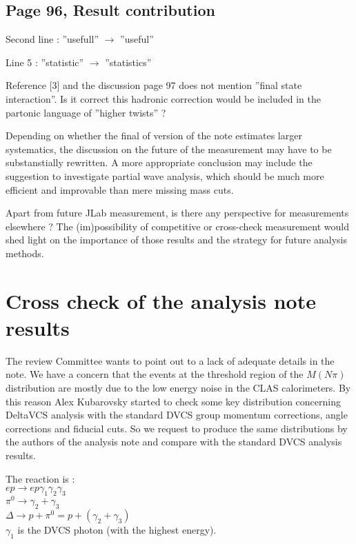 \documentclass[11pt]{paper}
\begin{document}
\subsection*{Page 96, Result contribution}
 
Second line : ''usefull'' $\rightarrow$ ''useful''
 
Line 5 : ''statistic'' $\rightarrow$ ''statistics''
  
Reference [3] and the discussion page 97 does not mention ''final state interaction''.
Is it correct this hadronic correction would be included in the partonic language of ''higher twists'' ?

Depending on whether the final of version of the note estimates larger systematics, the discussion on the future of the measurement may have to be substanstially rewritten.
A more appropriate conclusion may include the suggestion to investigate partial wave analysis, which should be much more efficient and improvable than mere missing mass cuts.

Apart from future JLab measurement, is there any perspective for measurements elsewhere ?
The (im)possibility of competitive or cross-check measurement would shed light on the importance of those results and the strategy for future analysis methods.

\section{Cross check of the analysis note results}

The review Committee wants to point out to
a lack of adequate details in the note. We have a concern that the events
at the threshold region of the $M(N\pi)$  distribution are mostly due to the low energy noise 
in the CLAS calorimeters.
By this reason  Alex Kubarovsky started to check some key distribution concerning
DeltaVCS analysis with the standard DVCS group momentum corrections, angle corrections and fiducial cuts. So we request to produce the same distributions by the authors of the analysis note  and compare with the 
standard DVCS analysis results.

The reaction is : \\
$ep \to e p \gamma_1 \gamma_2 \gamma_3$ \\
$\pi^0 \to  \gamma_2+\gamma_3 $  \\
$\Delta  \to p+\pi^0=p+(\gamma_2+\gamma_3) $\\
$\gamma_1$ is the DVCS photon (with the highest energy).
\end{document}
